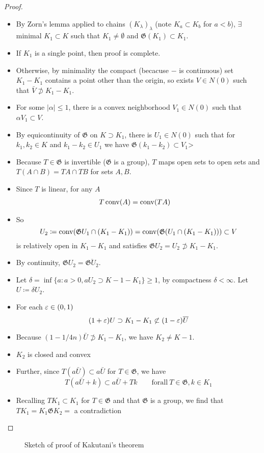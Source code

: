 \begin{proof}
  \begin{itemize}
    \item By Zorn's lemma applied to chains $(K_\lambda)_{\lambda}$ (note $K_a \subset K_b$
      for $a < b$), $\exists$ minimal $K_1 \subset K$
      such that $K_1 \neq \emptyset$ and $\mathfrak{G}(K_1) \subset K_1$.

    \item If $K_1$ is a single point, then proof is complete.
    \item Otherwise, by minimality the compact (becacuse $-$ is continuous)
      set $K_1 - K_1$ contains a point other than the origin, so
      exists $V \in N(0)$ such that $\bar{V} \not\supset K_1 - K_1$.
    \item For some $\lvert \alpha \rvert \leq 1$, there is a convex
      neighborhood $V_1 \in N(0)$ such that $\alpha V_1 \subset V$.
    \item By equicontinuity of $\mathfrak{G}$ on $K \supset K_1$, there is
      $U_1 \in N(0)$ such that for $k_1, k_2 \in K$ and
      $k_1 - k_2 \in U_1$ we have $\mathfrak{G}(k_1 - k_2) \subset V_1$>
    \item Because $T \in \mathfrak{G}$ is invertible
      ($\mathfrak{G}$ is a group), $T$ maps open sets
      to open sets and $T(A \cap B) = TA \cap TB$ for sets $A, B$.
    \item Since $T$ is linear, for any $A$
      \begin{align}
        T \operatorname{conv}(A) &= \operatorname{conv}(TA)
      \end{align}
    \item So
      \[
        U_2
        \coloneqq \operatorname{conv}(\mathfrak{G} U_1 \cap (K_1 - K_1)) \\
        = \operatorname{conv}(\mathfrak{G}(U_1 \cap (K_1 - K_1))) \subset V
      \]
      is relatively open in $K_1 - K_1$ and satisfies
      $\mathfrak{G} U_2 = U_2 \not\supset K_1 - K_1$.
    \item By continuity, $\mathfrak{G} U_2 = \overline{\mathfrak{G} U_2}$.
    \item Let $\delta = \inf \{ a : a > 0, a U_2 \supset K-1 - K_1 \} \geq 1$,
      by compactness $\delta < \infty$. Let $U \coloneqq \delta U_2$.
    \item For each $\varepsilon \in (0,1)$
      \[
        (1+\varepsilon) U \supset K_1 - K_1 \not\subset (1-\varepsilon) \overline{U}
      \]
    \item Because $(1 - 1/4n) \bar{U} \not\supset K_1 - K_1$, we have
      $K_2 \neq K-1$.
    \item $K_2$ is closed and convex
    \item Further, since $T(a \bar{U}) \subset a \bar{U}$ for $T \in
      \mathfrak{G}$, we have
      \[
        T(a\bar{U} + k)
        \subset a \bar{U} + T k
        \qquad \mathrm{for all}~T \in \mathfrak{G}, k \in K_1
      \]
    \item Recalling $T K_1 \subset K_1$ for $T \in \mathfrak{G}$
      and that $\mathfrak{G}$ is a group, we find that
      $T K_1 = K_1 \mathfrak{G} K_2 = $ 
      a contradiction
  \end{itemize}
\end{proof}

\begin{figure}[ht]
  \centering
  \caption{Sketch of proof of Kakutani's theorem}
\end{figure}
